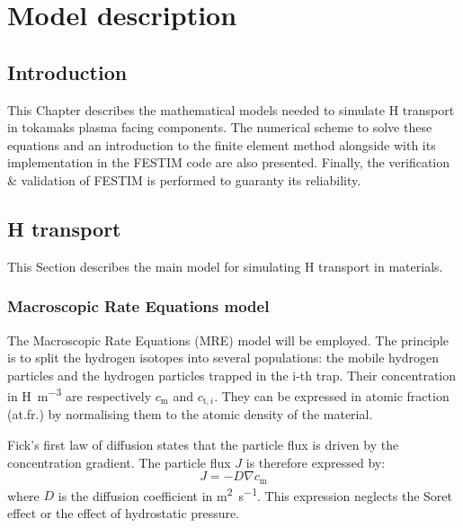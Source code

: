 \setchapterpreamble[u]{\margintoc}
\chapter{Model description}
\label{Chapter2} %
\section{Introduction}
This Chapter describes the mathematical models needed to simulate H transport in tokamaks plasma facing components.
The numerical scheme to solve these equations and an introduction to the finite element method alongside with its implementation in the FESTIM code are also presented.
Finally, the verification \& validation of FESTIM is performed to guaranty its reliability.

\section{H transport} \label{description_H_transport_model}

This Section describes the main model for simulating H transport in materials.

\subsection{Macroscopic Rate Equations model}

The Macroscopic Rate Equations (MRE) model will be employed.
The principle is to split the hydrogen isotopes into several populations: the mobile hydrogen particles and the hydrogen particles trapped in the i-th trap.
Their concentration in \si{H.m^{-3}} are respectively $c_\mathrm{m}$ and $c_{\mathrm{t},i}$.
They can be expressed in atomic fraction (at.fr.) by normalising them to the atomic density of the material.

Fick's first law of diffusion states that the particle flux is driven by the concentration gradient.
The particle flux $J$ is therefore expressed by:
\begin{equation}
    J = - D \nabla c_\mathrm{m}
\end{equation}
where $D$ is the diffusion coefficient in \si{m^2.s^{-1}}.
This expression neglects the Soret effect or the effect of hydrostatic pressure.


